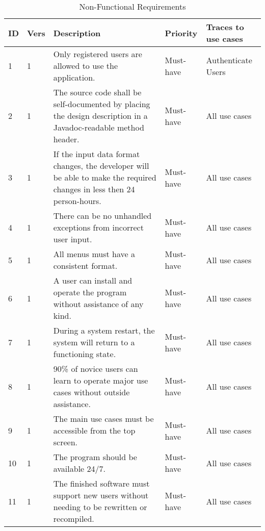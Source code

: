\documentclass[12pt]{article}
\begin{document}
\begin{table}[H]
\begin{center}
\begin{tabular} {|p{1cm}|p{1cm}|p{7cm}| p{2cm}|p{3cm}|}
\hline
\textbf{ID} & \textbf{Vers} & \textbf{Description} & \textbf{Priority}  & \textbf{Traces to use cases} \\
\hline 1 & 1 & Only registered users are allowed to use the application. & Must-have & Authenticate Users \\

\hline 2 & 1 & The source code shall be self-documented by placing the design description in a Javadoc-readable method header.  & Must-have & All use cases \\

\hline 3 & 1 & If the input data format changes, the developer will be able to make the required changes in less then 24 person-hours.  & Must-have & All use cases \\

\hline 4 & 1 & There can be no unhandled exceptions from incorrect user input.  & Must-have & All use cases \\

\hline 5 & 1 & All menus must have a consistent format.  & Must-have & All use cases \\

\hline 6 & 1 & A user can install and operate the program without assistance of any kind.  & Must-have & All use cases \\

\hline 7 & 1 & During a system restart, the system will return to a functioning state.   & Must-have & All use cases \\

\hline 8 & 1 & 90\% of novice users can learn to operate major use cases without outside assistance.   & Must-have & All use cases \\

\hline 9 & 1 & The main use cases must be accessible from the top screen.  & Must-have & All use cases \\

\hline 10 & 1 & The program should be available 24/7.   & Must-have & All use cases \\

\hline 11 & 1 & The finished software must support new users without needing to be rewritten or recompiled. & Must-have & All use cases \\



\hline
\end{tabular}
\caption{Non-Functional Requirements}
\end{center}
\end{table}
\end{document}

